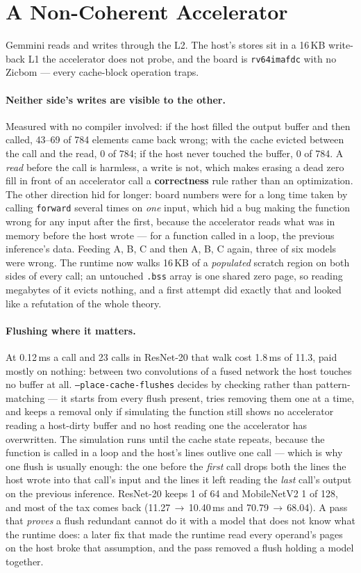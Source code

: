 \documentclass[runningheads]{llncs}
\begin{document}
\section{A Non-Coherent Accelerator}
\label{sec:cache}

Gemmini reads and writes through the L2. The host's stores sit in a 16\,KB
write-back L1 the accelerator does not probe, and the board is
\texttt{rv64imafdc} with no Zicbom --- every cache-block operation traps.

\paragraph{Neither side's writes are visible to the other.} Measured with no compiler involved: if the host filled the output buffer and then
called, 43--69 of 784 elements came back wrong; with the cache evicted between the
call and the read, 0 of 784; if the host never touched the buffer, 0 of 784. A
\emph{read} before the call is harmless, a write is not, which makes erasing a
dead zero fill in front of an accelerator call a \textbf{correctness} rule rather
than an optimization. The other direction hid for longer: board numbers were for a
long time taken by calling \texttt{forward} several times on \emph{one} input,
which hid a bug making the function wrong for any input after the first, because
the accelerator reads what was in memory before the host wrote --- for a function
called in a loop, the previous inference's data. Feeding A, B, C and then A, B, C
again, three of six models were wrong. The runtime now walks 16\,KB of a
\emph{populated} scratch region on both sides of every call; an untouched
\texttt{.bss} array is one shared zero page, so reading megabytes of it evicts
nothing, and a first attempt did exactly that and looked like a refutation of the
whole theory.

\paragraph{Flushing where it matters.} At 0.12\,ms a call and 23 calls in ResNet-20 that walk cost 1.8\,ms of 11.3, paid
mostly on nothing: between two convolutions of a fused network the host touches no
buffer at all. \texttt{--place-cache-flushes} decides by checking rather than
pattern-matching --- it starts from every flush present, tries removing them one at
a time, and keeps a removal only if simulating the function still shows no
accelerator reading a host-dirty buffer and no host reading one the accelerator has
overwritten. The simulation runs until the cache state repeats, because the function is
called in a loop and the host's lines outlive one call --- which is why one
flush is usually enough: the one before the \emph{first} call drops both the
lines the host wrote into that call's input and the lines it left reading the
\emph{last} call's output on the previous inference. ResNet-20 keeps 1
of 64 and MobileNetV2 1 of 128, and most of the tax comes back
(11.27\,$\to$\,10.40\,ms and 70.79\,$\to$\,68.04). A pass that \emph{proves} a flush
redundant cannot do it with a model that does not know what the runtime does: a
later fix that made the runtime read every operand's pages on the host broke that
assumption, and the pass removed a flush holding a model together.
\end{document}
